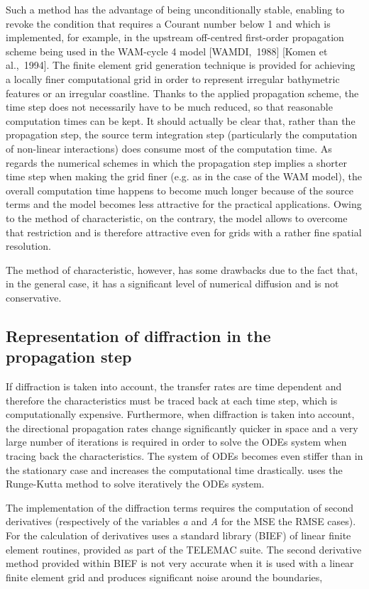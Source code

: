  Such a method has the advantage of being unconditionally stable, enabling to revoke the condition that requires a Courant number below 1 and which is implemented, for example, in the upstream off-centred first-order propagation scheme being used in the WAM-cycle 4 model [WAMDI,~1988] [Komen et al.,~1994]. The finite element grid generation technique is provided for achieving a locally finer computational grid in order to represent irregular bathymetric features or an irregular coastline. Thanks to the applied propagation scheme, the time step does not necessarily have to be much reduced, so that reasonable computation times can be kept. It should actually be clear that, rather than the propagation step, the source term integration step (particularly the computation of non-linear interactions) does consume most of the computation time. As regards the numerical schemes in which the propagation step implies a shorter time step when making the grid finer (e.g. as in the case of the WAM model), the overall computation time happens to become much longer because of the source terms and the model becomes less attractive for the practical applications. Owing to the method of characteristic, on the contrary, the \tomawac model allows to overcome that restriction and is therefore attractive even for grids with a rather fine spatial resolution.

 The method of characteristic, however, has some drawbacks due to the fact that, in the general case, it has a significant level of numerical diffusion and is not conservative.


\subsection{ Representation of diffraction in the propagation step}

 If diffraction is taken into account, the transfer rates are time dependent and therefore the characteristics must be traced back at each time step, which is computationally expensive. Furthermore, when diffraction is taken into account, the directional propagation rates change significantly quicker in space and a very large number of iterations is required in order to solve the ODEs system when tracing back the characteristics. The system of ODEs becomes even stiffer than in the stationary case and increases the computational time drastically. \tomawac uses the Runge-Kutta method to solve iteratively the ODEs system.

 The implementation of the diffraction terms requires the computation of second derivatives (respectively of the variables \textit{a} and \textit{A} for the MSE the RMSE cases). For the calculation of derivatives \tomawac uses a standard library (BIEF) of linear finite element routines, provided as part of the TELEMAC suite. The second derivative method provided within BIEF is not very accurate when it is used with a linear finite element grid and produces significant noise around the boundaries,


